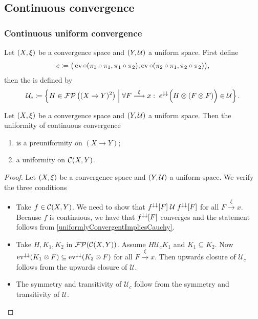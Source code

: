 \subsection{Continuous convergence}

\subsubsection{Continuous uniform convergence}
\begin{definition}
Let $\left( X, \xi \right)$ be a convergence space and $\left( Y, \mathcal{U} \right)$ a uniform space. First define
\[ e \coloneqq \big(\operatorname{ev}\circ (\pi_1\circ \pi_1, \pi_1\circ \pi_2), \operatorname{ev}\circ (\pi_2\circ \pi_1, \pi_2\circ \pi_2)\big), \]
then the  is defined by
\[ \mathcal{U}_c \coloneqq \left\{ H\in \operatorname{\mathcal{FP}}\big((X\to Y)^2\big) \;\middle|\; \forall F\overset{\xi}{\longrightarrow} x:\; e^{\downarrow\downarrow}\Big(H\otimes (F\otimes F)\Big) \in \mathcal{U} \right\}. \]
\end{definition}

\begin{lemma}
Let $\left( X, \xi \right)$ be a convergence space and $\left( Y, \mathcal{U} \right)$ a uniform space. Then the uniformity of continuous convergence
\begin{enumerate}
\item is a preuniformity on $(X\to Y)$;
\item a uniformity on $\operatorname{\mathcal{C}}(X,Y)$.
\end{enumerate}
\end{lemma}
\begin{proof}
Let $\left( X,\xi \right)$ be a convergence space and $\left( Y,\mathcal{U} \right)$ a uniform space. We verify the three conditions
\begin{itemize}
\item Take $f\in \operatorname{\mathcal{C}}(X,Y)$. We need to show that $f^{\downarrow\downarrow}[F]\mathrel{\mathcal{U}}f^{\downarrow\downarrow}[F]$ for all $F\overset{\xi}{\longrightarrow}x$. Because $f$ is continuous, we have that $f^{\downarrow\downarrow}[F]$ converges and the statement follows from \ref{uniformlyConvergentImpliesCauchy}.
\item Take $H,K_1,K_2$ in $\operatorname{\mathcal{FP}}(\operatorname{\mathcal{C}}(X,Y))$. Assume $H\mathrel{\mathcal{U}_c}K_1$ and $K_1\subseteq K_2$. Now $\operatorname{ev}^{\downarrow\downarrow}(K_1\otimes F) \subseteq \operatorname{ev}^{\downarrow\downarrow}(K_2\otimes F)$ for all $F\overset{\xi}{\longrightarrow}x$. Then upwards closure of $\mathcal{U}_c$ follows from the upwards closure of $\mathcal{U}$.
\item The symmetry and transitivity of $\mathcal{U}_c$ follow from the symmetry and transitivity of $\mathcal{U}$.
\end{itemize}
\end{proof}

